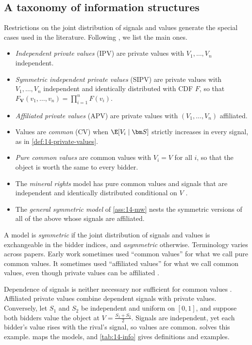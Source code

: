 \subsection{A taxonomy of information structures}\label{sec:14-info-taxonomy}

Restrictions on the joint distribution of signals and values generate the special cases used in the
literature. Following \citet[Section~2.1]{AtheyHaile2007}, we list the main ones.
\begin{itemize}
  \item \emph{Independent private values} (IPV) are private values with $V_1,\dots,V_n$ independent.
  \item \emph{Symmetric independent private values} (SIPV) are private values with $V_1,\dots,V_n$
  independent and identically distributed with CDF $F$, so that
  $F_{\bm V}(v_1,\dots,v_n)=\prod_{i=1}^{n}F(v_i)$.
  \item \emph{Affiliated private values} (APV) are private values with $(V_1,\dots,V_n)$ affiliated.
  \item Values are \emph{common} (CV) when $\E[V_i\mid\bm S]$ strictly increases in every signal, as in
  \cref{def:14-private-values}.
  \item \emph{Pure common values} are common values with $V_i=V$ for all $i$, so that the object is worth
  the same to every bidder.
  \item The \emph{mineral rights} model has pure common values and signals that are independent and
  identically distributed conditional on $V$ \citep{Wilson1977}.
  \item The \emph{general symmetric model} of \cref{ass:14-mw} nests the symmetric versions of all of the
  above whose signals are affiliated.
\end{itemize}
A model is \emph{symmetric} if the joint distribution of signals and values is exchangeable in the bidder
indices, and \emph{asymmetric} otherwise. Terminology varies across papers. Early work sometimes used
``common values'' for what we call pure common values. It sometimes used ``affiliated values'' for what we
call common values, even though private values can be affiliated \citep[footnote~8]{AtheyHaile2007}.

Dependence of signals is neither necessary nor sufficient for common values
\citep[Section~2.1]{AtheyHaile2007}. Affiliated private values combine dependent signals with private
values. Conversely, let $S_1$ and $S_2$ be independent and uniform on $[0,1]$, and suppose both bidders
value the object at $V=\frac{S_1+S_2}{2}$. Signals are independent, yet each bidder's value rises with the
rival's signal, so values are common.  solves this example.  maps the
models, and \cref{tab:14-info} gives definitions and examples.

